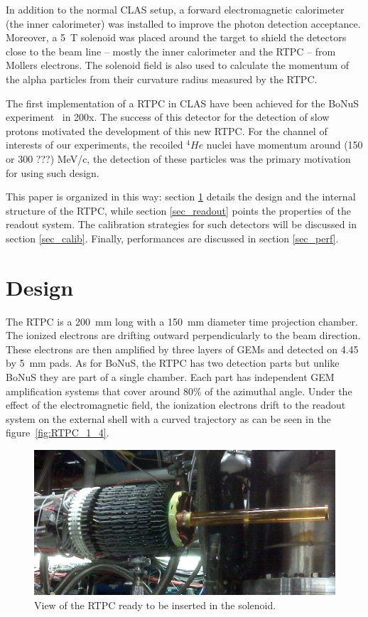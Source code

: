\documentclass[aps,prl,twocolumn,showpacs,superscriptaddress,groupedaddress]{revtex4}
\begin{document}
In addition to the normal CLAS setup, a forward electromagnetic calorimeter (the inner calorimeter) was installed to improve the photon detection acceptance. Moreover, a 5~T solenoid was placed around the target to shield the detectors close to the beam line -- mostly the inner calorimeter and the RTPC -- from Mollers electrons. The solenoid field is also used to calculate the momentum of the alpha particles from their curvature radius measured by the RTPC.

The first implementation of a RTPC in CLAS have been achieved for the BoNuS experiment~\cite{BONUS} in 200x. The success of this detector for the detection of slow protons motivated the development of this new RTPC. For the channel of interests of our experiments, the recoiled $^{4}He$ nuclei have momentum around (150 or 300 ???) MeV/c, the detection of these particles was the primary motivation for using such design. 

This paper is organized in this way: section \ref{sec_design} details the design and the internal structure of the RTPC, while section \ref{sec_readout} points the properties of the readout system. The calibration strategies for such detectors will be discussed in section \ref{sec_calib}. Finally, performances are discussed in section \ref{sec_perf}.

 
\section{Design} \label{sec_design}

The RTPC is a 200~mm long with a 150~mm diameter time projection chamber. The ionized electrons are drifting outward perpendicularly to the beam direction. These electrons are then amplified by three layers of GEMs and detected on 4.45 by 5~mm pads. As for BoNuS, the RTPC has two detection parts but unlike BoNuS they are part of a single chamber. Each part has independent GEM amplification systems that cover around 80\% of the azimuthal angle. Under the effect of the electromagnetic field, the ionization electrons drift to the readout system on the external shell with a curved trajectory as can be seen in the figure~\ref{fig:RTPC_1_4}.

\begin{figure}[tb]
\centering
\includegraphics[scale=0.19]{fig/RTPC_exp.png}
\caption[]{\small\sf View of the RTPC ready to be inserted in the solenoid. } 
\label{fig:RTPC2}
\end{figure}
\end{document}
